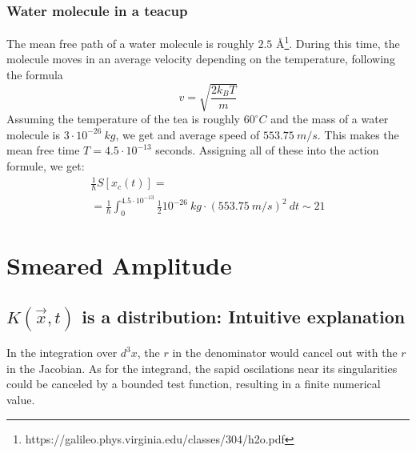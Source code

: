 \documentclass{article}
\begin{document}
\subsubsection{Water molecule in a teacup}
The mean free path of a water molecule is roughly $2.5$ \AA \footnote{https://galileo.phys.virginia.edu/classes/304/h2o.pdf}. During this time, the molecule moves in an average velocity depending on the temperature, following the formula
\begin{equation}
    v = \sqrt{\frac{2 k_B T}{m}}
\end{equation}
Assuming the temperature of the tea is roughly $60^\circ C$ and the mass of a water molecule is $3 \cdot 10^{-26} \ kg$, we get and average speed of $553.75 \ m/s$. This makes the mean free time $T = 4.5 \cdot 10^{-13}$ seconds. Assigning all of these into the action formule, we get:
\begin{equation}
\begin{gathered}
    \frac{1}{\hbar}S[x_c(t)] = \\
    = \frac{1}{\hbar} \int_{0}^{4.5\cdot10^{-13}} \frac{1}{2} 10^{-26} \ kg \cdot \left(553.75 \ m/s\right)^2 \ dt \sim 21
\end{gathered}
\end{equation}
\section{Smeared Amplitude}
\subsection{$K\left(\vec{x}, t\right)$ is a distribution: Intuitive explanation}
In the integration over $d^3x$, the $r$ in the denominator would cancel out with the $r$ in the Jacobian. As for the integrand, the sapid oscilations near its singularities could be canceled by a bounded test function, resulting in a finite numerical value.
\end{document}
